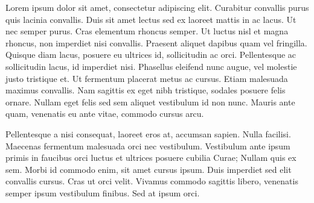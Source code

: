 
Lorem ipsum dolor sit amet, consectetur adipiscing elit. Curabitur convallis purus quis lacinia convallis. Duis sit amet lectus sed ex laoreet mattis in ac lacus. Ut nec semper purus. Cras elementum rhoncus semper. Ut luctus nisl et magna rhoncus, non imperdiet nisi convallis. Praesent aliquet dapibus quam vel fringilla. Quisque diam lacus, posuere eu ultrices id, sollicitudin ac orci. Pellentesque ac sollicitudin lacus, id imperdiet nisi. Phasellus eleifend nunc augue, vel molestie justo tristique et. Ut fermentum placerat metus ac cursus. Etiam malesuada maximus convallis. Nam sagittis ex eget nibh tristique, sodales posuere felis ornare. Nullam eget felis sed sem aliquet vestibulum id non nunc. Mauris ante quam, venenatis eu ante vitae, commodo cursus arcu.


Pellentesque a nisi consequat, laoreet eros at, accumsan sapien. Nulla facilisi. Maecenas fermentum malesuada orci nec vestibulum. Vestibulum ante ipsum primis in faucibus orci luctus et ultrices posuere cubilia Curae; Nullam quis ex sem. Morbi id commodo enim, sit amet cursus ipsum. Duis imperdiet sed elit convallis cursus. Cras ut orci velit. Vivamus commodo sagittis libero, venenatis semper ipsum vestibulum finibus. Sed at ipsum orci.